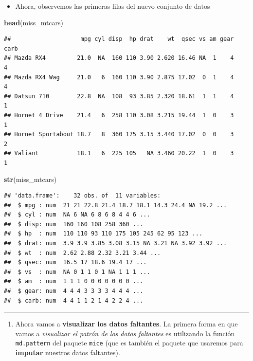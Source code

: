 \documentclass[
]{book}
\newenvironment{Shaded}{\begin{snugshade}}{\end{snugshade}}
\newcommand{\FunctionTok}[1]{\textcolor[rgb]{0.13,0.29,0.53}{\textbf{#1}}}
\newcommand{\NormalTok}[1]{#1}
\providecommand{\tightlist}{%
  \setlength{\itemsep}{0pt}\setlength{\parskip}{0pt}}
\begin{document}
\begin{itemize}
\tightlist
\item
  Ahora, observemos las primeras filas del nuevo conjunto de datos
\end{itemize}

\begin{Shaded}
\begin{Highlighting}[]
\FunctionTok{head}\NormalTok{(miss\_mtcars)}
\end{Highlighting}
\end{Shaded}

\begin{verbatim}
##                    mpg cyl disp  hp drat    wt  qsec vs am gear carb
## Mazda RX4         21.0  NA  160 110 3.90 2.620 16.46 NA  1    4    4
## Mazda RX4 Wag     21.0   6  160 110 3.90 2.875 17.02  0  1    4    4
## Datsun 710        22.8  NA  108  93 3.85 2.320 18.61  1  1    4    1
## Hornet 4 Drive    21.4   6  258 110 3.08 3.215 19.44  1  0    3    1
## Hornet Sportabout 18.7   8  360 175 3.15 3.440 17.02  0  0    3    2
## Valiant           18.1   6  225 105   NA 3.460 20.22  1  0    3    1
\end{verbatim}

\begin{Shaded}
\begin{Highlighting}[]
\FunctionTok{str}\NormalTok{(miss\_mtcars)}
\end{Highlighting}
\end{Shaded}

\begin{verbatim}
## 'data.frame':    32 obs. of  11 variables:
##  $ mpg : num  21 21 22.8 21.4 18.7 18.1 14.3 24.4 NA 19.2 ...
##  $ cyl : num  NA 6 NA 6 8 6 8 4 4 6 ...
##  $ disp: num  160 160 108 258 360 ...
##  $ hp  : num  110 110 93 110 175 105 245 62 95 123 ...
##  $ drat: num  3.9 3.9 3.85 3.08 3.15 NA 3.21 NA 3.92 3.92 ...
##  $ wt  : num  2.62 2.88 2.32 3.21 3.44 ...
##  $ qsec: num  16.5 17 18.6 19.4 17 ...
##  $ vs  : num  NA 0 1 1 0 1 NA 1 1 1 ...
##  $ am  : num  1 1 1 0 0 0 0 0 0 0 ...
##  $ gear: num  4 4 4 3 3 3 3 4 4 4 ...
##  $ carb: num  4 4 1 1 2 1 4 2 2 4 ...
\end{verbatim}

\begin{center}\rule{0.5\linewidth}{0.5pt}\end{center}

\begin{enumerate}
\def\labelenumi{\arabic{enumi}.}
\setcounter{enumi}{1}
\tightlist
\item
  Ahora vamos a \textbf{visualizar los datos faltantes}. La primera forma en que vamos a \emph{visualizar el patrón de los datos faltantes} es utilizando la función \texttt{md.pattern} del paquete \texttt{mice} (que es también el paquete que usaremos para \textbf{imputar} nuestros datos faltantes).
\end{enumerate}
\end{document}
